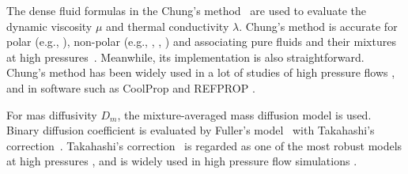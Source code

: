 The dense fluid formulas in the Chung's method~\cite{chung1988generalized} are used to evaluate the dynamic viscosity $\mu$ and thermal conductivity $\lambda$. Chung's method is accurate for polar (e.g., ), non-polar (e.g., , , ) and associating pure fluids and their mixtures at high pressures~\cite{chung1988generalized}. Meanwhile, its implementation is also straightforward. Chung's method has been widely used in a lot of studies of high pressure flows \cite{zhu2002model,trujillo2004high,yan2006high,matheis2018multi,tudisco2020vapor}, and in software such as CoolProp \cite{bell2014pure} and REFPROP \cite{lemmon2018nist}.

For mas diffusivity $D_m$, the mixture-averaged mass diffusion model is used. Binary diffusion coefficient is evaluated by Fuller’s model~\cite{fuller1966new} with Takahashi’s correction~\cite{takahashi1975preparation}. Takahashi’s correction~\cite{takahashi1975preparation} is regarded as one of the most robust models at high pressures \cite{meng2005transport}, and is widely used in high pressure flow simulations \cite{xu2018validation,pohl2013real,nguyen2022real,ribert2017high}. %



